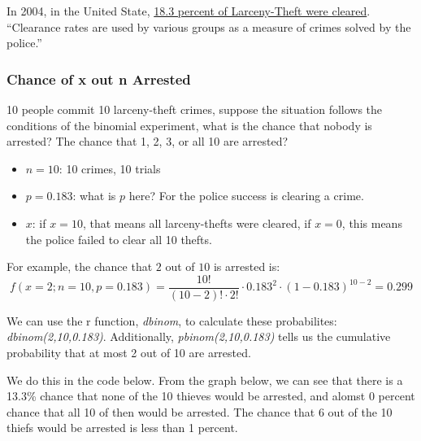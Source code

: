 \documentclass[
]{book}
\providecommand{\tightlist}{%
  \setlength{\itemsep}{0pt}\setlength{\parskip}{0pt}}
\begin{document}
In 2004, in the United State, \href{https://en.wikipedia.org/wiki/Clearance_rate}{18.3 percent of Larceny-Theft were cleared}. ``Clearance rates are used by various groups as a measure of crimes solved by the police.''

\hypertarget{chance-of-x-out-n-arrested}{%
\subsubsection{Chance of x out n Arrested}\label{chance-of-x-out-n-arrested}}

10 people commit 10 larceny-theft crimes, suppose the situation follows the conditions of the binomial experiment, what is the chance that nobody is arrested? The chance that 1, 2, 3, or all 10 are arrested?

\begin{itemize}
\tightlist
\item
  \(n=10\): 10 crimes, 10 trials
\item
  \(p=0.183\): what is \(p\) here? For the police success is clearing a crime.
\item
  \(x\): if \(x=10\), that means all larceny-thefts were cleared, if \(x=0\), this means the police failed to clear all 10 thefts.
\end{itemize}

For example, the chance that \(2\) out of \(10\) is arrested is:
\[f\left(x=2;n=10,p=0.183\right) = \frac{10!}{\left(10-2\right)! \cdot 2!} \cdot 0.183^2 \cdot \left(1-0.183\right)^{10-2} = 0.299\]

We can use the r function, \emph{dbinom}, to calculate these probabilites: \emph{dbinom(2,10,0.183)}. Additionally, \emph{pbinom(2,10,0.183)} tells us the cumulative probability that at most 2 out of 10 are arrested.

We do this in the code below. From the graph below, we can see that there is a 13.3\% chance that none of the 10 thieves would be arrested, and alomst 0 percent chance that all 10 of then would be arrested. The chance that 6 out of the 10 thiefs would be arrested is less than 1 percent.
\end{document}
